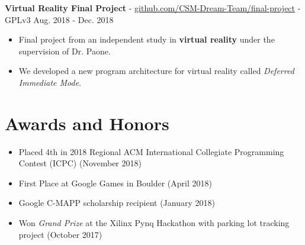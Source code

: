 \documentclass[10pt,letterpaper]{article}
\begin{document}

\textbf{Virtual Reality Final Project} -
\href{https://github.com/CSM-Dream-Team/final-project}{github.com/CSM-Dream-Team/final-project}
- GPLv3 \hfill Aug. 2018 - Dec. 2018
\begin{itemize}
    \item Final project from an independent study in \textbf{virtual reality}
        under the supervision of Dr. Paone.
    \item We developed a new program architecture for virtual reality called
        \textit{Deferred Immediate Mode}.
\end{itemize}

\section*{Awards and Honors}
\begin{itemize}
    \item Placed 4th in 2018 Regional ACM International Collegiate Programming
        Contest (ICPC) (November 2018)
    \item First Place at Google Games in Boulder (April 2018)
    \item Google C-MAPP scholarship recipient (January 2018)
    \item Won \textit{Grand Prize} at the Xilinx Pynq Hackathon with parking lot
        tracking project (October 2017)
\end{itemize}
\end{document}
